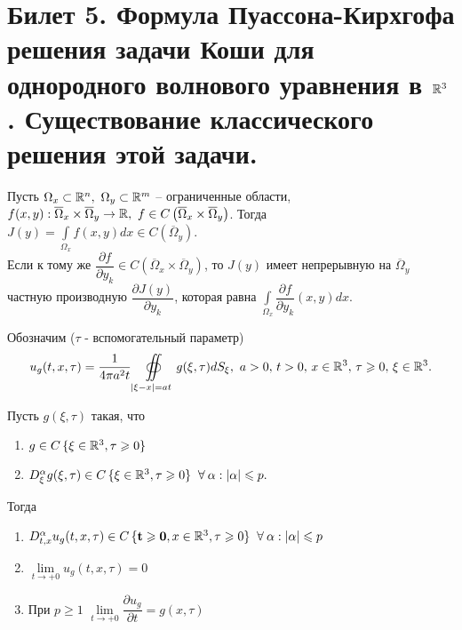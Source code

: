 \documentclass[../main.tex]{subfiles}
\begin{document}
\section{Билет 5. Формула Пуассона-Кирхгофа решения задачи Коши для однородного волнового уравнения в \texorpdfstring{$\mathbb{R}^3$}{R\textasciicircum 3}. Существование классического решения этой задачи.}
\begin{theorem}
Пусть $\Omega_x\subset\R^n,\ \Omega_y\subset\R^m$ -- ограниченные области, $f(x,y):\overline{\Omega}_x\times\overline{\Omega}_y\rightarrow \mathbb{R},\ f\in C\left(\overline{\Omega}_x\times\overline{\Omega}_y \right)$. Тогда $J(y)=\displaystyle\int\limits_{\Omega_x}f(x,y)dx\in C\left(\overline{\Omega}_y \right)$.\\
Если к тому же $\dfrac{\partial f}{\partial y_k}\in C\left(\overline{\Omega}_x\times\overline{\Omega}_y \right)$, то $J(y)$ имеет непрерывную на $\overline{\Omega}_y$ частную производную $\dfrac{\partial J(y)}{\partial y_k}$, которая равна $\displaystyle\int\limits_{\Omega_x}\dfrac{\partial f}{\partial y_k}(x,y)dx.$
\end{theorem}
Обозначим ($\tau$ - вспомогательный параметр)
\[
u_g(t,x,\tau)=\frac{1}{4\pi a^2t}\displaystyle\oiint\limits_{|\xi - x|=at}g(\xi ,\tau ) dS_{\xi},\ a>0,\, t> 0,\, x\in \R^3,\, \tau \geq 0,\, \xi\in\R^3.
\]
\begin{lemma}
\label{lem:5:continuity}
Пусть $g(\xi, \tau )$ такая, что 
\begin{enumerate}
\item $g \in C\,\{\xi\in\mathbb{R}^3,\tau\geqslant 0 \}$
\item $D_{\xi}^{\alpha}g(\xi , \tau )\in C\,\{\xi\in\mathbb{R}^3,\tau\geqslant 0 \} \;\;\forall\:\alpha : |\alpha |\leqslant p.$
\end{enumerate}
Тогда
\begin{enumerate}
\item $D_{t,x}^{\alpha}u_g(t,x,\tau )\in C\,\{\mathbf{t\geqslant 0}, x\in\mathbb{R}^3,\tau\geqslant 0 \} \;\;\forall\:\alpha : |\alpha |\leqslant p$
\item $\lim\limits_{t\rightarrow +0}u_g(t,x,\tau )=0$
\item При $p\geq 1$ $\lim\limits_{t\rightarrow +0}\dfrac{\partial u_g}{\partial t}=g(x,\tau)$
\end{enumerate}
\end{lemma}
\end{document}
